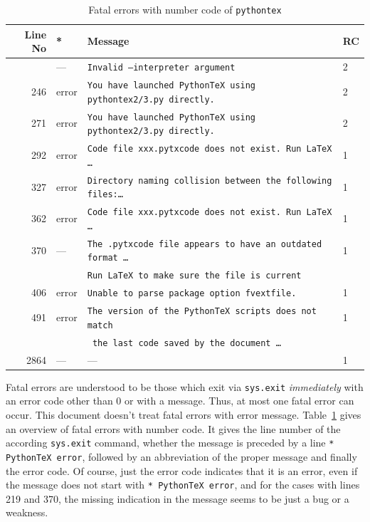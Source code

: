 \documentclass[a4paper, english]{article}%
\begin{document}
{\small
\begin{longtable}{rlll}
\toprule
Line No       & * & Message & RC \\
\midrule
\midrule
\endfirsthead%
\bottomrule
\caption{\label{tab:pytexFErr} Fatal errors with number code of \texttt{pythontex}}
\endlastfoot%
 219 & ---   & \texttt{Invalid --interpreter argument} & 2 \\
 246 & error & \texttt{You have launched PythonTeX using pythontex2/3.py directly.}   & 2 \\
 271 & error & \texttt{You have launched PythonTeX using pythontex2/3.py directly.}   & 2 \\
 292 & error & \texttt{Code file xxx.pytxcode does not exist. Run LaTeX \dots }       & 1 \\
 327 & error & \texttt{Directory naming collision between the following files:\dots}  & 1 \\
 362 & error & \texttt{Code file xxx.pytxcode does not exist. Run \LaTeX{} \dots }    & 1 \\
 370 & ---   & \texttt{The .pytxcode file appears to have an outdated format \dots}   & 1 \\%
     &       & \texttt{Run LaTeX to make sure the file is current }                   &   \\
 406 & error & \texttt{Unable to parse package option fvextfile.  }                   & 1 \\
 491 & error & \texttt{The version of the PythonTeX scripts does not match }          & 1 \\
     &       & \texttt{ the last code saved by the document \dots}                    &   \\
2864 & ---   & ---                                                                    & 1 \\
\end{longtable}
} %


Fatal errors are understood to be those which exit via \texttt{sys.exit} 
\emph{immediately} with an error code other than 0 or with a message. 
Thus, at most one fatal error can occur. 
This document doesn't treat fatal errors with error message. 
Table~\ref{tab:pytexFErr} gives an overview of fatal errors with number code. 
It gives the line number of the according \texttt{sys.exit} command, 
whether the message is preceded by a line \texttt{* PythonTeX error}, 
followed by an abbreviation of the proper message and finally the error code. 
Of course, just the error code indicates that it is an error, 
even if the message does not start with \texttt{* PythonTeX error}, 
and for the cases with lines 219 and 370, 
the missing indication in the message seems to be just a bug or a weakness. 
\end{document}
